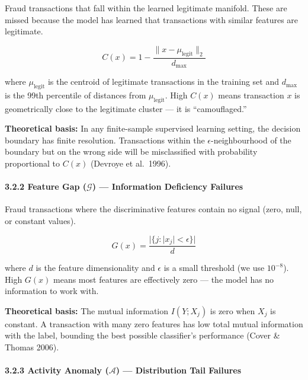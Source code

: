\documentclass[
  11pt,
]{article}
\begin{document}
Fraud transactions that fall within the learned legitimate manifold.
These are missed because the model has learned that transactions with
similar features are legitimate.

\[C(x) = 1 - \frac{\|x - \mu_{\text{legit}}\|_2}{d_{\max}}\]

where \(\mu_{\text{legit}}\) is the centroid of legitimate transactions
in the training set and \(d_{\max}\) is the 99th percentile of distances
from \(\mu_{\text{legit}}\). High \(C(x)\) means transaction \(x\) is
geometrically close to the legitimate cluster — it is “camouflaged.”

\textbf{Theoretical basis:} In any finite-sample supervised learning
setting, the decision boundary has finite resolution. Transactions
within the \(\epsilon\)-neighbourhood of the boundary but on the wrong
side will be misclassified with probability proportional to \(C(x)\)
(Devroye et al.~1996).

\paragraph{\texorpdfstring{3.2.2 Feature Gap (\(\mathcal{G}\)) —
Information Deficiency
Failures}{3.2.2 Feature Gap (\textbackslash mathcal\{G\}) — Information Deficiency Failures}}\label{feature-gap-mathcalg-information-deficiency-failures}

Fraud transactions where the discriminative features contain no signal
(zero, null, or constant values).

\[G(x) = \frac{|\{j : |x_j| < \epsilon\}|}{d}\]

where \(d\) is the feature dimensionality and \(\epsilon\) is a small
threshold (we use \(10^{-8}\)). High \(G(x)\) means most features are
effectively zero — the model has no information to work with.

\textbf{Theoretical basis:} The mutual information \(I(Y; X_j)\) is zero
when \(X_j\) is constant. A transaction with many zero features has low
total mutual information with the label, bounding the best possible
classifier’s performance (Cover \& Thomas 2006).

\paragraph{\texorpdfstring{3.2.3 Activity Anomaly (\(\mathcal{A}\)) —
Distribution Tail
Failures}{3.2.3 Activity Anomaly (\textbackslash mathcal\{A\}) — Distribution Tail Failures}}\label{activity-anomaly-mathcala-distribution-tail-failures}
\end{document}
